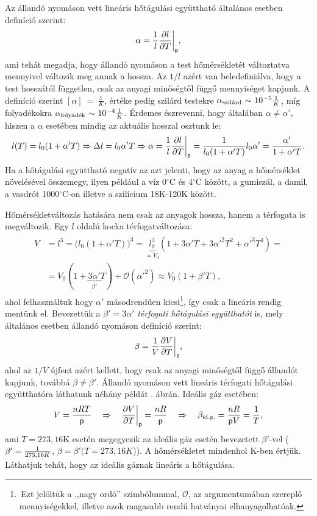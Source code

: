 Az állandó nyomáson vett lineáris hőtágulási együttható általános esetben definíció szerint:
\begin{align}
    \alpha = \frac{1}{l} \frac{\partial{l}}{\partial{T}}\bigg|_\mathsf p,
\end{align}
ami tehát megadja, hogy állandó nyomáson a test hőmérsékletét változtatva mennyivel változik meg annak a hossza. Az $1/l$ azért van beledefiniálva, hogy a test hosszától független, csak az anyagi minőségtől függő mennyiséget kapjunk. A definíció szerint $[\alpha]~{=}~\frac 1K$, értéke pedig szilárd testekre $\alpha_{\textnormal{szilárd}}~{\sim}~10^{-5} \frac 1K$, míg folyadékokra $\alpha_{\textnormal{folyadék}}~{\sim}~10^{-4} \frac 1K$. Érdemes észrevenni, hogy általában $\alpha\neq\alpha'$, hiszen a $\alpha$ esetében mindig az aktuális hosszal osztunk le:
\begin{align}
    l(T) = l_0(1+\alpha' T)\Rightarrow \Delta l = l_0\alpha' T \Rightarrow \alpha = \frac{1}{l} \frac{\partial{l}}{\partial{T}}\bigg|_\mathsf p = \frac{1}{l_0(1+\alpha' T)}l_0\alpha' = \frac{\alpha'}{1+\alpha' T}.
\end{align}
Ha a hőtágulási együttható negatív az azt jelenti, hogy az anyag a hőmérséklet növelésével összemegy, ilyen például a víz 0$^\circ$C és 4$^\circ$C között, a gumiszál, a damil, a vasdrót 1000$^\circ$C-on illetve a szilícium 18K-120K között.

Hőmérsékletváltozás hatására nem csak az anyagok hossza, hanem a térfogata is megváltozik. Egy $l$ oldalú kocka térfogatváltozása:
\begin{align}
\begin{split}
    V &= l^3 = \big(l_0(1+\alpha' T) \big)^3 = \underbrace{l_0^3}_{=V_0}(1+3\alpha' T +3{\alpha'}^2 T^2 + {\alpha'}^3 T^3) =\\
    &=V_0(1+\underbrace{3\alpha'}_{\beta'} T) + \mathcal O({\alpha'}^2) \approx V_0(1+\beta' T),
\end{split}
\end{align}
ahol felhasználtuk hogy $\alpha'$ másodrendűen kicsi\footnote{\,Ezt jelöltük a ,,nagy ordó'' szimbólummal, $\mathcal O$, az argumentumában szereplő mennyiségekkel, illetve azok magasabb rendű hatványai elhanyagolhatóak.}, így csak a lineáris rendig mentünk el. Bevezettük a $\beta' = 3\alpha'$ \emph{térfogati hőtágulási együtthatót} is, mely általános esetben állandó nyomáson definíció szerint:
\begin{align}
    \beta = \frac{1}{V} \frac{\partial{V}}{\partial{T}}\bigg|_\mathsf p,
\end{align}
ahol az $1/V$ újfent azért kellett, hogy csak az anyagi minőségtől függő állandót kapjunk, továbbá $\beta\neq\beta'$. Állandó nyomáson vett lineáris térfogati hőtágulási együtthatóra láthatunk néhány példát . ábrán. Ideális gáz esetében:
\begin{align}
    V = \frac{nRT}{\mathsf p} \quad\Rightarrow\quad \frac{\partial{V}}{\partial{T}}\bigg|_\mathsf p = \frac{nR}{\mathsf p} \quad\Rightarrow\quad \beta_{\textnormal{id.g.}} = \frac{nR}{\mathsf p V}=\frac{1}{T},
\end{align}
ami $T = 273{,}16$K esetén megegyezik az ideális gáz esetén bevezetett $\beta'$-vel ($\beta' = \frac{1}{273{,}16K}$, $\beta=\beta'(T{=}273{,}16K$)). A hőmérsékletet mindenhol K-ben értjük. Láthatjuk tehát, hogy az ideális gáznak lineáris a hőtágulása.

